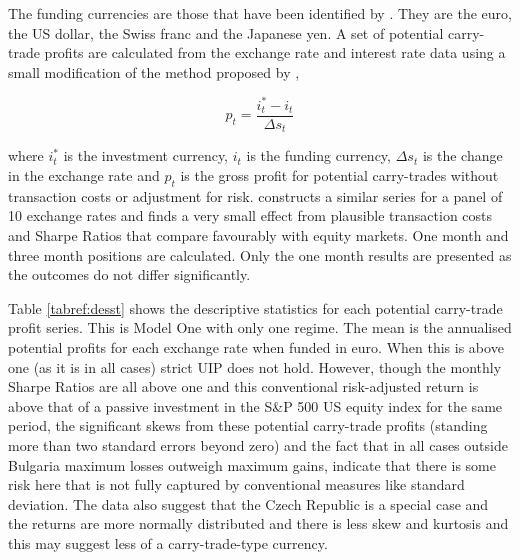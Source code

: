 \documentclass[12pt, a4paper, oneside]{article}\usepackage[]{graphicx}\usepackage[]{color}
\begin{document}
The funding currencies are those that have been identified by \citet{FTS}. They are the euro, the US dollar, the Swiss franc and the Japanese yen. A set of potential carry-trade profits are calculated from the exchange rate and interest rate data using a small modification of the method proposed by \citet{BrunnermeierCarry},   

\begin{equation}
p_t = \frac{i^*_t - i_t}{\Delta s_t}
\end{equation} 

where $i_t^*$ is the investment currency, $i_t$ is the funding currency, $\Delta s_t$ is the change in the exchange rate and $p_t$ is the gross profit for potential carry-trades without transaction costs or adjustment for risk.  \citet{Burnside2010} constructs a similar series for a panel of 10 exchange rates and finds a very small effect from plausible transaction costs and Sharpe Ratios that compare favourably with equity markets.  One month and three month positions are calculated. Only the one month results are presented as the outcomes do not differ significantly. 

Table \ref{tabref:desst} shows the descriptive statistics for each potential carry-trade profit series. This is Model One with only one regime. The mean is the annualised potential profits for each exchange rate when funded in euro. When this is above one (as it is in all cases) strict UIP does not hold. However, though the monthly Sharpe Ratios are all above one and this conventional risk-adjusted return is above that of a passive investment in the S\&P 500 US equity index for the same period, the significant skews from these potential carry-trade profits (standing more than two standard errors beyond zero) and the fact that in all cases outside Bulgaria maximum losses outweigh maximum gains, indicate that there is some risk here that is not fully captured by conventional measures like standard deviation. The data also suggest that the Czech Republic is a special case and the returns are more normally distributed and there is less skew and kurtosis and this may suggest less of a carry-trade-type currency.  
\end{document}
